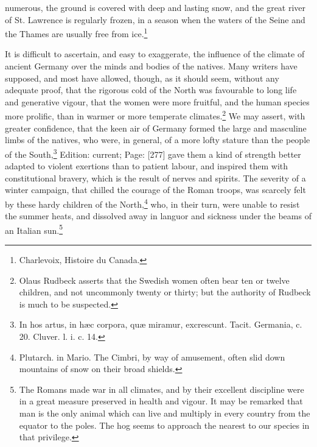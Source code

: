 numerous, the ground is covered with deep and lasting snow, and the great river of St. Lawrence is regularly frozen, in a season when the waters of the Seine and the Thames are usually free from ice.\footnote{Charlevoix, Histoire du Canada.}

It is difficult to ascertain, and easy to exaggerate, the influence of the climate of ancient Germany over the minds and bodies of the natives. Many writers have supposed, and most have allowed, though, as it should seem, without any adequate proof, that the rigorous cold of the North was favourable to long life and generative vigour, that the women were more fruitful, and the human species more prolific, than in warmer or more temperate climates.\footnote{Olaus Rudbeck asserts that the Swedish women often bear ten or twelve children, and not uncommonly twenty or thirty; but the authority of Rudbeck is much to be suspected.} We may assert, with greater confidence, that the keen air of Germany formed the large and masculine limbs of the natives, who were, in general, of a more lofty stature than the people of the South,\footnote{In hos artus, in hæc corpora, quæ miramur, excrescunt. Tacit. Germania, c. 20. Cluver. l. i. c. 14.} Edition: current; Page: [277] gave them a kind of strength better adapted to violent exertions than to patient labour, and inspired them with constitutional bravery, which is the result of nerves and spirits. The severity of a winter campaign, that chilled the courage of the Roman troops, was scarcely felt by these hardy children of the North,\footnote{Plutarch. in Mario. The Cimbri, by way of amusement, often slid down mountains of snow on their broad shields.} who, in their turn, were unable to resist the summer heats, and dissolved away in languor and sickness under the beams of an Italian sun.\footnote{The Romans made war in all climates, and by their excellent discipline were in a great measure preserved in health and vigour. It may be remarked that man is the only animal which can live and multiply in every country from the equator to the poles. The hog seems to approach the nearest to our species in that privilege.}

